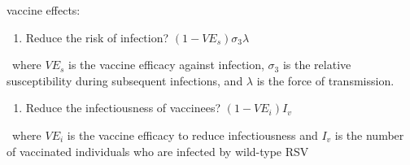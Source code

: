 \documentclass[
]{article}
\providecommand{\tightlist}{%
  \setlength{\itemsep}{0pt}\setlength{\parskip}{0pt}}
\begin{document}
vaccine effects:

\begin{enumerate}
\def\labelenumi{(\arabic{enumi})}
\tightlist
\item
  Reduce the risk of infection? \((1-VE_{s})\sigma_3\lambda\)
\end{enumerate}

~where \(VE_{s}\) is the vaccine efficacy against infection,
\(\sigma_3\) is the relative susceptibility during subsequent
infections, and \(\lambda\) is the force of transmission.

\begin{enumerate}
\def\labelenumi{(\arabic{enumi})}
\setcounter{enumi}{1}
\tightlist
\item
  Reduce the infectiousness of vaccinees? \((1-VE_{i})I_v\)
\end{enumerate}

~where \(VE_{i}\) is the vaccine efficacy to reduce infectiousness and
\(I_v\) is the number of vaccinated individuals who are infected by
wild-type RSV
\end{document}
